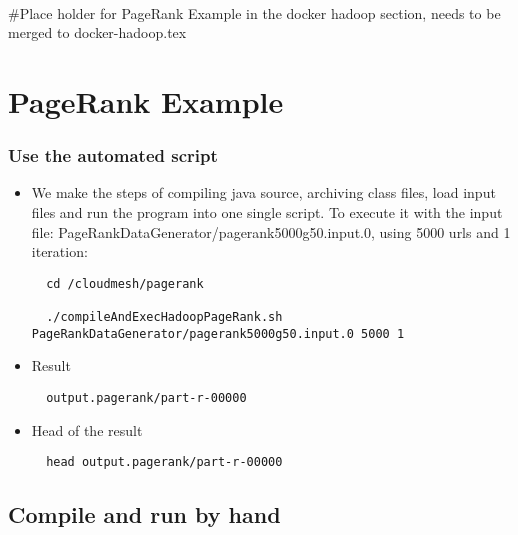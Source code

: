 \MDNAME\

\#Place holder for PageRank Example in the docker hadoop section, needs
to be merged to docker-hadoop.tex

\section{PageRank Example}

\subsubsection{Use the automated script}

\begin{itemize}
\item
  We make the steps of compiling java source, archiving class files,
  load input files and run the program into one single script. To
  execute it with the input file:
  PageRankDataGenerator/pagerank5000g50.input.0, using 5000 urls and 1
  iteration:

\begin{lstlisting}
  cd /cloudmesh/pagerank

  ./compileAndExecHadoopPageRank.sh PageRankDataGenerator/pagerank5000g50.input.0 5000 1
\end{lstlisting}
\item
  Result

\begin{lstlisting}
  output.pagerank/part-r-00000
\end{lstlisting}
\item
  Head of the result

\begin{lstlisting}
  head output.pagerank/part-r-00000
\end{lstlisting}
\end{itemize}

\subsection{Compile and run by hand}

